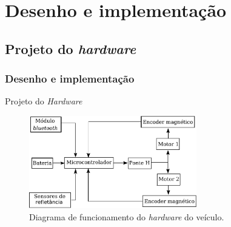 \section{Desenho e implementação}

\subsection{Projeto do \textit{hardware}}

\begin{frame}
\frametitle{Desenho e implementação}

Projeto do \textit{Hardware}

\begin{figure}[th]
	\centering
	\captionsetup{width=0.65\textwidth,font=footnotesize,textfont=bf}
	\includegraphics[width=0.65\textwidth,keepaspectratio]{Figuras/DiagramaHW.pdf}
	\caption{Diagrama de funcionamento do \textit{hardware} do veículo.\label{fig:diagEl}}
\end{figure}

\end{frame}


